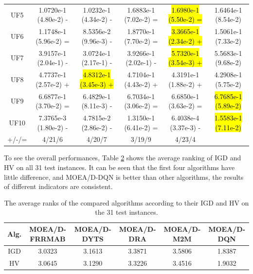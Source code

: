 \documentclass[journal]{IEEEtran}
\begin{document}
\begin{table}[tbp]
\begin{tabular}{cccccc}
    UF5     & 1.0720e-1 (4.80e-2) -      & 1.0232e-1 (4.34e-2) -      & 1.6883e-1 (7.02e-2) =      & \hl{1.6980e-1 (5.50e-2) =} & 1.6464e-1 (8.54e-2)      \\
    UF6     & 1.1748e-1 (5.96e-2) =      & 8.5356e-2 (9.96e-3) -      & 1.8770e-1 (7.70e-2) =      & \hl{3.3665e-1 (2.34e-2) +} & 1.5061e-1 (7.33e-2)      \\
    UF7     & 3.9157e-1 (2.04e-1) -      & 3.0724e-1 (2.17e-1) -      & 3.9266e-1 (2.02e-1) -      & \hl{5.7320e-1 (3.54e-3) +} & 5.5683e-1 (9.68e-2)      \\
    UF8     & 4.7737e-1 (2.57e-2) +      & \hl{4.8312e-1 (3.45e-3) +} & 4.7104e-1 (4.43e-2) +      & 4.3191e-1 (1.88e-2) +      & 4.2908e-1 (5.75e-2)      \\
    UF9     & 6.6877e-1 (3.70e-2) =      & 6.4829e-1 (8.11e-3) -      & 6.7034e-1 (3.06e-2) =      & 6.6850e-1 (3.63e-2) =      & \hl{6.7685e-1 (5.89e-2)} \\
    UF10    & 7.3765e-3 (1.80e-2) -      & 4.7815e-2 (2.86e-2) -      & 1.3150e-1 (6.41e-2) =      & 6.4038e-4 (3.37e-3) -      & \hl{1.5583e-1 (7.11e-2)} \\
    \hline
    +/-/=   & 4/21/6                     & 4/20/7                     & 3/19/9                     & 4/23/4                     &                          \\
    \bottomrule
  \end{tabular}
  \label{tab:hv_all}
\end{table}

To see the overall performances, Table \ref{tab:rank_all} shows the average ranking of IGD and HV on all 31 test instances.
It can be seen that the first four algorithms have little difference, and MOEA/D-DQN is better than other algorithms, the results of different indicators are consistent.


\begin{table}[tbp]
  \renewcommand{\arraystretch}{1.2}  %
  \centering
  \caption{The average ranks of the compared algorithms according to their IGD and HV on the 31 test instances.}
  \begin{tabular}{cccccc}
    \toprule
    Alg. & MOEA/D-FRRMAB & MOEA/D-DYTS & MOEA/D-DRA & MOEA/D-M2M & MOEA/D-DQN \\
    \midrule
    IGD  & 3.0323        & 3.1613      & 3.3871     & 3.5806     & 1.8387     \\
    HV   & 3.0645        & 3.1290      & 3.3226     & 3.4516     & 1.9032     \\
    \bottomrule
  \end{tabular}
  \label{tab:rank_all}
\end{table}
\end{document}

